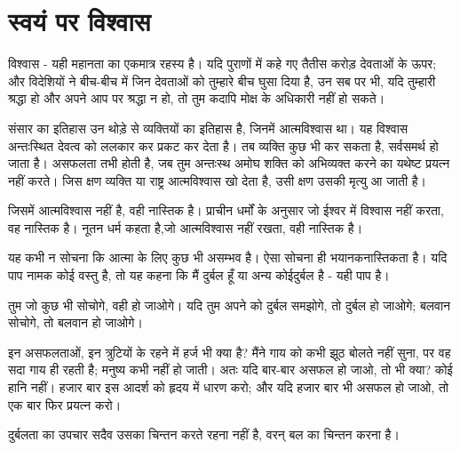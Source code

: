 
\chapter{स्वयं पर विश्वास }



विश्वास - यही महानता का एकमात्र रहस्य है। यदि पुराणों में कहे गए तैतीस करोड़ देवताओं के ऊपर; और विदेशियों ने बीच-बीच में जिन देवताओं को तुम्हारे बीच घुसा दिया है, उन सब पर भी, यदि तुम्हारी श्रद्धा हो और अपने आप पर श्रद्धा न हो, तो तुम कदापि मोक्ष के अधिकारी नहीं हो सकते। 

\vskip 2pt

संसार का इतिहास उन थोड़े से व्यक्तियों का इतिहास है, जिनमें आत्मविश्वास था। यह विश्वास अन्तःस्थित देवत्व को ललकार कर प्रकट कर देता है। तब व्यक्ति कुछ भी कर सकता है, सर्वसमर्थ हो जाता है। असफलता तभी होती है, जब तुम अन्तःस्थ अमोघ शक्ति को अभिव्यक्त करने का यथेष्ट प्रयत्न नहीं करते। जिस क्षण व्यक्ति या राष्ट्र आत्मविश्वास खो देता है, उसी क्षण उसकी मृत्यु आ जाती है। 

\vskip 2pt

जिसमें आत्मविश्वास नहीं है, वही नास्तिक है। प्राचीन धर्मों के अनुसार जो ईश्वर में विश्वास नहीं करता, वह नास्तिक है। नूतन धर्म कहता है,जो आत्मविश्वास नहीं रखता, वही नास्तिक है। 

\vskip 2pt

यह कभी न सोचना कि आत्मा के लिए कुछ भी असम्भव है। ऐसा सोचना ही भयानक\break नास्तिकता है। यदि पाप नामक कोई वस्तु है, तो यह कहना कि मैं दुर्बल हूँ या अन्य कोई\break दुर्बल है - यही पाप है। 

\vskip 2pt

तुम जो कुछ भी सोचोगे, वही हो जाओगे। यदि तुम अपने को दुर्बल समझोगे, तो दुर्बल हो जाओगे; बलवान सोचोगे, तो बलवान हो जाओगे। 

\vskip 2pt

इन असफलताओं, इन त्रुटियों के रहने में हर्ज भी क्या है? मैंने गाय को कभी झूठ बोलते नहीं सुना, पर वह सदा गाय ही रहती है; मनुष्य कभी नहीं हो जाती। अतः यदि बार-बार असफल हो जाओ, तो भी क्या? कोई हानि नहीं। हजार बार इस आदर्श को हृदय में धारण करो; और यदि हजार बार भी असफल हो जाओ, तो एक बार फिर प्रयत्न करो। 

\vskip 2pt

दुर्बलता का उपचार सदैव उसका चिन्तन करते रहना नहीं है, वरन् बल का चिन्तन करना है। 

